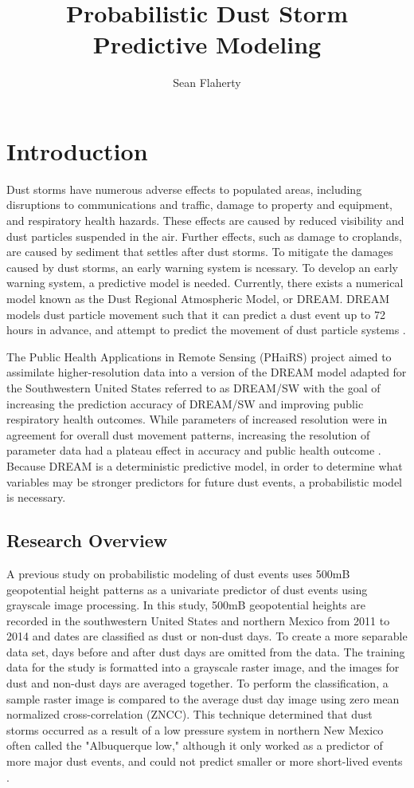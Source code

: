 \documentclass{article}
\author{Sean Flaherty}
\title{Probabilistic Dust Storm Predictive Modeling}
\begin{document}
\maketitle
\section{Introduction}
Dust storms have numerous adverse effects to populated areas, including disruptions to communications and traffic, damage to property and equipment, and respiratory health hazards. These effects are caused by reduced visibility and dust particles suspended in the air. Further effects, such as damage to croplands, are caused by sediment that settles after dust storms. To mitigate the damages caused by dust storms, an early warning system is ncessary. To develop an early warning system, a predictive model is needed. Currently, there exists a numerical model known as the Dust Regional Atmospheric Model, or DREAM. DREAM models dust particle movement such that it can predict a dust event up to 72 hours in advance, and attempt to predict the movement of dust particle systems \cite{unep}. 

The Public Health Applications in Remote Sensing (PHaiRS) project aimed to assimilate higher-resolution data into a version of the DREAM model adapted for the Southwestern United States referred to as DREAM/SW with the goal of increasing the prediction accuracy of DREAM/SW and improving public respiratory health outcomes. While parameters of increased resolution were in agreement for overall dust movement patterns, increasing the resolution of parameter data had a plateau effect in accuracy and public health outcome \cite{phairs}. Because DREAM is a deterministic predictive model, in order to determine what variables may be stronger predictors for future dust events, a probabilistic model is necessary.

\subsection{Research Overview}
A previous study on probabilistic modeling of dust events uses 500mB geopotential height patterns as a univariate predictor of dust events using grayscale image processing. In this study, 500mB geopotential heights are recorded in the southwestern United States and northern Mexico from 2011 to 2014 and dates are classified as dust or non-dust days. To create a more separable data set, days before and after dust days are omitted from the data. The training data for the study is formatted into a grayscale raster image, and the images for dust and non-dust days are averaged together. To perform the classification, a sample raster image is compared to the average dust day image using zero mean normalized cross-correlation (ZNCC). This technique determined that dust storms occurred as a result of a low pressure system in northern New Mexico often called the "Albuquerque low," although it only worked as a predictor of more major dust events, and could not predict smaller or more short-lived events \cite{500mb}.
\end{document}

